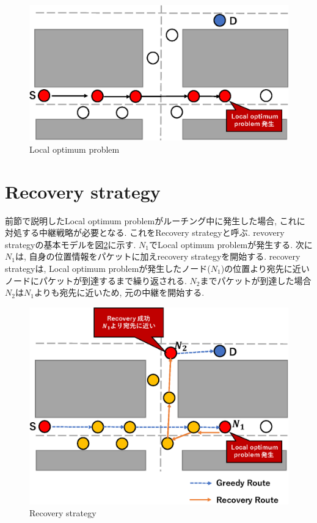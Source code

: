 \documentclass[10pt]{jreport}
\begin{document}
\begin{figure}[!ht]
	\centering
	\includegraphics[width=130mm]{figures/Local_optimum_problem.eps}
	\caption{Local optimum problem}
	\label{fig:Local_optimum}
\end{figure}

\section{Recovery strategy}
前節で説明したLocal optimum problemがルーチング中に発生した場合, これに対処する中継戦略が必要となる. これをRecovery strategy\cite{28}と呼ぶ. revovery strategyの基本モデルを図\ref{fig:Recovery}に示す. $N_{1}$でLocal optimum problemが発生する. 次に$N_{1}$は, 自身の位置情報をパケットに加えrecovery strategyを開始する. recovery strategyは, Local optimum problemが発生したノード($N_{1}$)の位置より宛先に近いノードにパケットが到達するまで繰り返される. $N_{2}$までパケットが到達した場合$N_{2}$は$N_{1}$よりも宛先に近いため, 元の中継を開始する. 
  

\begin{figure}[!ht]
	\centering
	\includegraphics[width=130mm]{figures/basic-recovery.eps}
	\caption{Recovery strategy}
	\label{fig:Recovery}
\end{figure}
\end{document}
